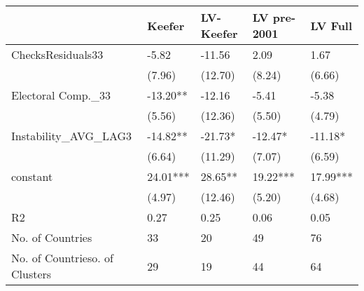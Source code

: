 \begin{tabular}{lllll}
  \hline
 & Keefer & LV-Keefer & LV pre-2001 & LV Full \\ 
  \hline
ChecksResiduals33 & -5.82 & -11.56 & 2.09 & 1.67 \\ 
   & (7.96) & (12.70) & (8.24) & (6.66) \\ 
  Electoral Comp.\_33 & -13.20** & -12.16 & -5.41 & -5.38 \\ 
   & (5.56) & (12.36) & (5.50) & (4.79) \\ 
  Instability\_AVG\_LAG3 & -14.82** & -21.73* & -12.47* & -11.18* \\ 
   & (6.64) & (11.29) & (7.07) & (6.59) \\ 
  constant & 24.01*** & 28.65** & 19.22*** & 17.99*** \\ 
   & (4.97) & (12.46) & (5.20) & (4.68) \\ 
  R2 & 0.27 & 0.25 & 0.06 & 0.05 \\ 
  No. of Countries & 33 & 20 & 49 & 76 \\ 
  No. of Countrieso. of Clusters & 29 & 19 & 44 & 64 \\ 
   \hline
\end{tabular}

